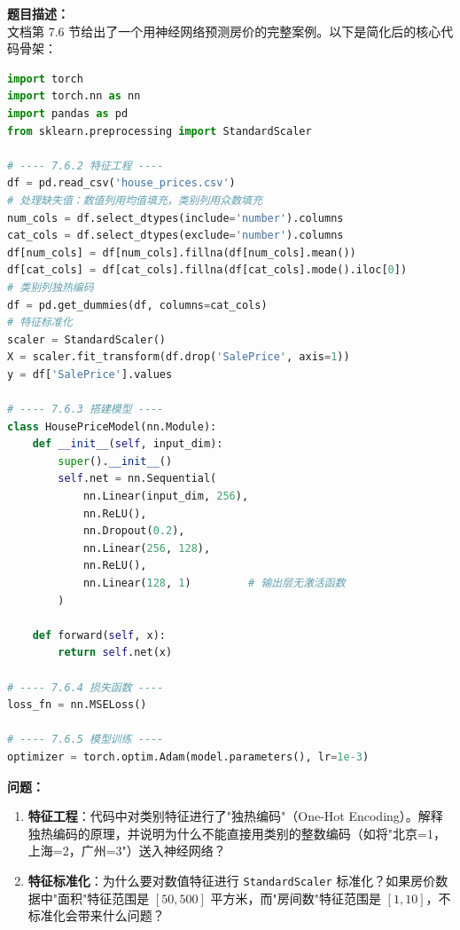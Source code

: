 \documentclass[a4paper,11pt]{ctexart}
\begin{document}
\begin{problembox}
    \textbf{题目描述：}\\
    文档第 7.6 节给出了一个用神经网络预测房价的完整案例。以下是简化后的核心代码骨架：

    \begin{lstlisting}[language=Python]
import torch
import torch.nn as nn
import pandas as pd
from sklearn.preprocessing import StandardScaler

# ---- 7.6.2 特征工程 ----
df = pd.read_csv('house_prices.csv')
# 处理缺失值：数值列用均值填充，类别列用众数填充
num_cols = df.select_dtypes(include='number').columns
cat_cols = df.select_dtypes(exclude='number').columns
df[num_cols] = df[num_cols].fillna(df[num_cols].mean())
df[cat_cols] = df[cat_cols].fillna(df[cat_cols].mode().iloc[0])
# 类别列独热编码
df = pd.get_dummies(df, columns=cat_cols)
# 特征标准化
scaler = StandardScaler()
X = scaler.fit_transform(df.drop('SalePrice', axis=1))
y = df['SalePrice'].values

# ---- 7.6.3 搭建模型 ----
class HousePriceModel(nn.Module):
    def __init__(self, input_dim):
        super().__init__()
        self.net = nn.Sequential(
            nn.Linear(input_dim, 256),
            nn.ReLU(),
            nn.Dropout(0.2),
            nn.Linear(256, 128),
            nn.ReLU(),
            nn.Linear(128, 1)         # 输出层无激活函数
        )

    def forward(self, x):
        return self.net(x)

# ---- 7.6.4 损失函数 ----
loss_fn = nn.MSELoss()

# ---- 7.6.5 模型训练 ----
optimizer = torch.optim.Adam(model.parameters(), lr=1e-3)
    \end{lstlisting}

    \vspace{0.2cm}
    \textbf{问题：}
    \begin{enumerate}[(1)]
        \item \textbf{特征工程}：代码中对类别特征进行了"独热编码"（One-Hot Encoding）。解释独热编码的原理，并说明为什么不能直接用类别的整数编码（如将"北京=1，上海=2，广州=3"）送入神经网络？

        \item \textbf{特征标准化}：为什么要对数值特征进行 \texttt{StandardScaler} 标准化？如果房价数据中"面积"特征范围是 $[50, 500]$ 平方米，而"房间数"特征范围是 $[1, 10]$，不标准化会带来什么问题？


\end{enumerate}
\end{problembox}
\end{document}
